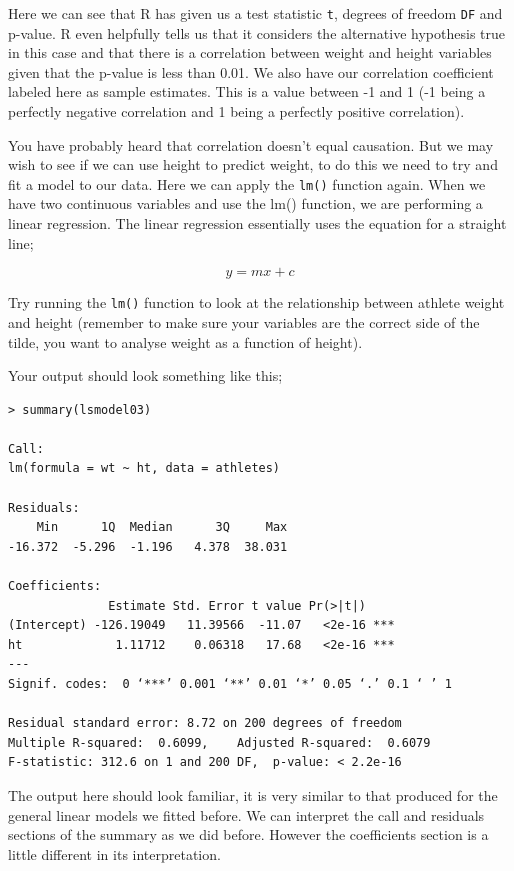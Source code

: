 \documentclass[
]{book}
\begin{document}
Here we can see that R has given us a test statistic \texttt{t}, degrees of freedom \texttt{DF} and p-value. R even helpfully tells us that it considers the alternative hypothesis true in this case and that there is a correlation between weight and height variables given that the p-value is less than 0.01. We also have our correlation coefficient labeled here as sample estimates. This is a value between -1 and 1 (-1 being a perfectly negative correlation and 1 being a perfectly positive correlation).

You have probably heard that correlation doesn't equal causation. But we may wish to see if we can use height to predict weight, to do this we need to try and fit a model to our data. Here we can apply the \texttt{lm()} function again. When we have two continuous variables and use the lm() function, we are performing a linear regression. The linear regression essentially uses the equation for a straight line;

\[
y = mx+c
\]

Try running the \texttt{lm()} function to look at the relationship between athlete weight and height (remember to make sure your variables are the correct side of the tilde, you want to analyse weight as a function of height).

Your output should look something like this;

\begin{verbatim}
> summary(lsmodel03)

Call:
lm(formula = wt ~ ht, data = athletes)

Residuals:
    Min      1Q  Median      3Q     Max 
-16.372  -5.296  -1.196   4.378  38.031 

Coefficients:
              Estimate Std. Error t value Pr(>|t|)    
(Intercept) -126.19049   11.39566  -11.07   <2e-16 ***
ht             1.11712    0.06318   17.68   <2e-16 ***
---
Signif. codes:  0 ‘***’ 0.001 ‘**’ 0.01 ‘*’ 0.05 ‘.’ 0.1 ‘ ’ 1

Residual standard error: 8.72 on 200 degrees of freedom
Multiple R-squared:  0.6099,    Adjusted R-squared:  0.6079 
F-statistic: 312.6 on 1 and 200 DF,  p-value: < 2.2e-16
\end{verbatim}

The output here should look familiar, it is very similar to that produced for the general linear models we fitted before. We can interpret the call and residuals sections of the summary as we did before. However the coefficients section is a little different in its interpretation.
\end{document}
